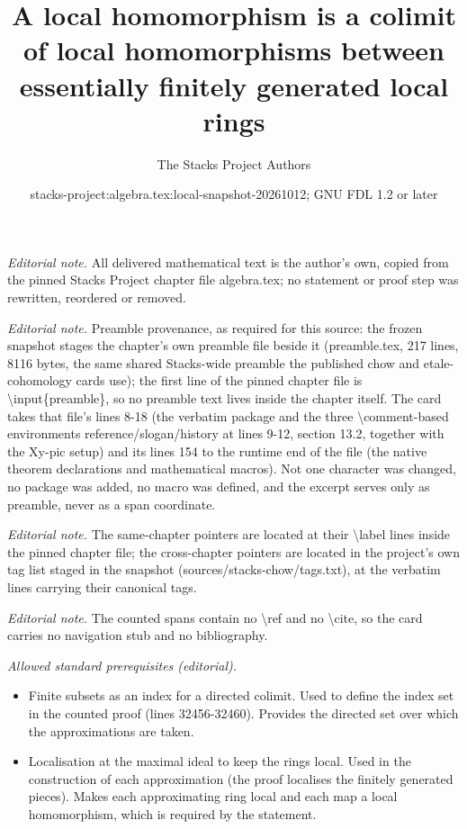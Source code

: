 \documentclass[10pt,a4paper]{amsart}
\title{A local homomorphism is a colimit of local homomorphisms between essentially finitely generated local rings}
\author{The Stacks Project Authors}
\date{stacks-project:algebra.tex:local-snapshot-20261012; GNU FDL 1.2 or later}
\theoremstyle{plain}
\theoremstyle{definition}
\theoremstyle{remark}
\numberwithin{equation}{subsection}
\begin{document}
\maketitle
\noindent\textit{Editorial note.} All delivered mathematical text is the author's own, copied from the pinned Stacks Project chapter file algebra.tex; no statement or proof step was rewritten, reordered or removed.\par\medskip
\noindent\textit{Editorial note.} Preamble provenance, as required for this source: the frozen snapshot stages the chapter's own preamble file beside it (preamble.tex, 217 lines, 8116 bytes, the same shared Stacks-wide preamble the published chow and etale-cohomology cards use); the first line of the pinned chapter file is \textbackslash{}input\{preamble\}, so no preamble text lives inside the chapter itself. The card takes that file's lines 8-18 (the verbatim package and the three \textbackslash{}comment-based environments reference/slogan/history at lines 9-12, section 13.2, together with the Xy-pic setup) and its lines 154 to the runtime end of the file (the native theorem declarations and mathematical macros). Not one character was changed, no package was added, no macro was defined, and the excerpt serves only as preamble, never as a span coordinate.\par\medskip
\noindent\textit{Editorial note.} The same-chapter pointers are located at their \textbackslash{}label lines inside the pinned chapter file; the cross-chapter pointers are located in the project's own tag list staged in the snapshot (sources/stacks-chow/tags.txt), at the verbatim lines carrying their canonical tags.\par\medskip
\noindent\textit{Editorial note.} The counted spans contain no \textbackslash{}ref and no \textbackslash{}cite, so the card carries no navigation stub and no bibliography.\par\medskip
\noindent\textit{Allowed standard prerequisites (editorial).}\begin{itemize}
\item Finite subsets as an index for a directed colimit. Used to define the index set in the counted proof (lines 32456-32460). Provides the directed set over which the approximations are taken.
\item Localisation at the maximal ideal to keep the rings local. Used in the construction of each approximation (the proof localises the finitely generated pieces). Makes each approximating ring local and each map a local homomorphism, which is required by the statement.
\end{itemize}\medskip
\end{document}
